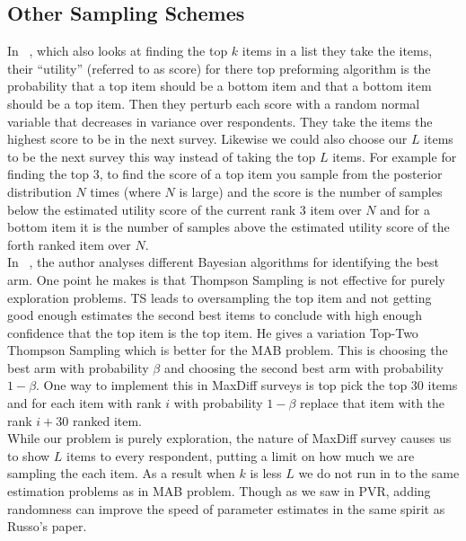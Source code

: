 \documentclass[nonblindrev]{informs3}
\begin{document}
\subsection{Other Sampling Schemes}
In ~\cite{toubia2007adaptive}, which also looks at finding the top $k$ items in a list they take the items, their ``utility'' (referred to as score) for there top preforming algorithm is the probability that a top item should be a bottom item and that a bottom item should be a top item. Then they perturb each score with a random normal variable that decreases in variance over respondents. They take the items the highest score to be in the next survey. Likewise we could also choose our $L$ items to be the next survey this way instead of taking the top $L$ items. For example for finding the top 3, to find the score of a top item you sample from the posterior distribution $N$ times (where $N$ is large) and the score is the number of samples below the estimated utility score of the current rank 3 item over $N$ and for a bottom item it is the number of samples above the estimated utility score of the forth ranked item over $N$.\\
In ~\cite{russo2016simple}, the author analyses different Bayesian algorithms for identifying the best arm. One point he makes is that Thompson Sampling is not effective for purely exploration problems. TS leads to oversampling the top item and not getting good enough estimates the second best items to conclude with high enough confidence that the top item is the top item. He gives a variation Top-Two Thompson Sampling which is better for the MAB problem. This is choosing the best arm with probability $\beta$ and choosing the second best arm with probability $1-\beta$. One way to implement this in MaxDiff surveys is top pick the top 30 items and for each item with rank $i$ with probability $1-\beta$ replace that item with the rank $i+30$ ranked item.\\
While our problem is purely exploration, the nature of MaxDiff survey causes us to show $L$ items to every respondent, putting a limit on how much we are sampling the each item. As a result when $k$ is less $L$ we do not run in to the same estimation problems as in MAB problem. Though as we saw in PVR, adding randomness can improve the speed of parameter estimates in the same spirit as Russo's paper.\\
\end{document}
